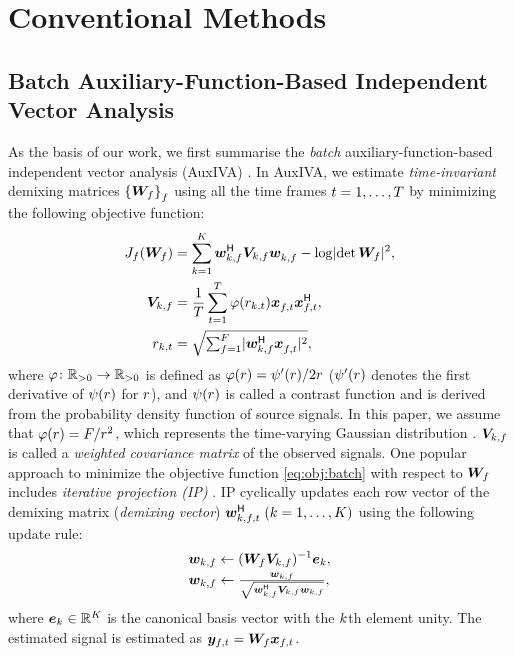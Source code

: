 \documentclass[sip,biber]{now-journal}
\begin{document}
\section{Conventional Methods}\label{sec:conventional}

\subsection{Batch Auxiliary-Function-Based Independent Vector Analysis}
As the basis of our work, we first summarise the \emph{batch} auxiliary-function-based independent vector analysis (AuxIVA) \cite{Ono:2011:WASPAA}.
In AuxIVA, we estimate \emph{time-invariant} demixing matrices ${\{\bm{W} _{f}\}} _{f}$ using all the time frames $t = 1, \dots, T$ by minimizing the following objective function:
\begin{align}
  J _{\freq}(\Demix _{\freq}) &= \sum _{\src = 1} ^{\Src} \demix _{\src,\freq} ^{\hermite} \cov _{\src,\freq} \demix _{\src,\freq} ^{\nohermite} - \logdet{\Demix _{\freq}} ^2, \label{eq:obj:batch} \\
  \cov _{\src,\freq} &= \frac{1}{\Tframe} \sum _{\tframe = 1} ^{\Tframe} \weight(\var _{\src,\tframe}) \Obs _{\ft} ^{\nohermite} \Obs _{\ft} ^{\hermite}, \label{eq:cov:batch} \\
  \var _{\src,\tframe} &= \textstyle\sqrt{\sum _{\freq=1} ^{\Freq} \lvert \demix ^{\hermite} _{\src,\freq} \Obs ^{\nohermite}_{\ft} \rvert ^2} \label{eq:var:batch},
\end{align}
where
$\varphi\colon \mathbb{R} _{>0} \to \mathbb{R} _{>0}$ is defined as $\varphi(r) = \psi ' (r) / 2 r$ ($\psi '(r)$ denotes the first derivative of $\psi (r)$ for $r$),
and $\psi(r)$ is called a contrast function and is derived from the probability density function of source signals.
In this paper, we assume that $\varphi (r) = F/{r ^2}$, which represents the time-varying Gaussian distribution \cite{Ono:2012:APSIPA}.
$\bm{V} _{k,f}$ is called a \emph{weighted covariance matrix} of the observed signals.
One popular approach to minimize the objective function \eqref{eq:obj:batch} with respect to $\bm{W} _{f}$ includes \emph{iterative projection (IP)} \cite{Ono:2011:WASPAA}.
IP cyclically updates each row vector of the demixing matrix (\emph{demixing vector}) $\demix _{\src,\ft} ^{\hermite}\; (\src = 1, \dots, \Src)$ using the following update rule:
\begin{align}
  \bm{w} _{k,f} &\gets (\bm{W} _{f} \bm{V} _{k,f}) ^{-1} \bm{e} _{k} \label{eq:ip:proj}, \\
  \bm{w} _{k,f} &\gets \tfrac{{\bm{w} _{k,f}}}{{\sqrt{\bm{w} _{k,f} ^{\mathsf{H}} \bm{V} _{k,f} \bm{w} _{k,f}}}} \label{eq:ip:norm},
\end{align}
where $\bm{e} _{k} \in \mathbb{R} ^{K}$ is the canonical basis vector with the $k$th element unity.
The estimated signal is estimated as $\Est _{\ft} = \Demix _{\freq} \Obs _{\ft}$.
\end{document}
